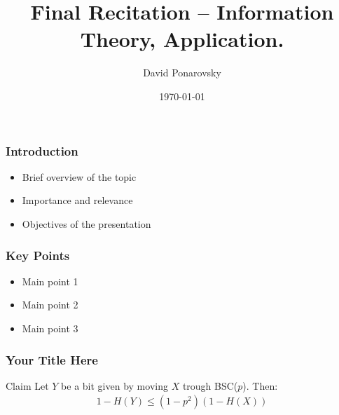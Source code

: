 \documentclass{beamer}
\begin{document}
 
 

\begin{frame}
    \title{Final Recitation – Information Theory, Application.}
    \author{David Ponarovsky}
    \date{\today}
    \titlepage
\end{frame}


\begin{frame}

\frametitle{Introduction}
\begin{itemize}
    \item Brief overview of the topic
    \item Importance and relevance
    \item Objectives of the presentation
\end{itemize}
\end{frame}

\begin{frame}
\frametitle{Key Points}
\begin{itemize}
    \item Main point 1
    \item Main point 2
    \item Main point 3
\end{itemize}
\end{frame}

\begin{frame}
  \frametitle{Your Title Here}
  
\begin{block}{Claim}
  Let $Y$ be a bit given by moving $X$ trough BSC($p$). Then:
  \begin{equation*}
    \begin{split}
      1 - H(Y) \le \left( 1 - p^{2} \right)\left( 1 - H(X) \right)
    \end{split}
  \end{equation*}
\end{block}

\end{frame}
\end{document}
